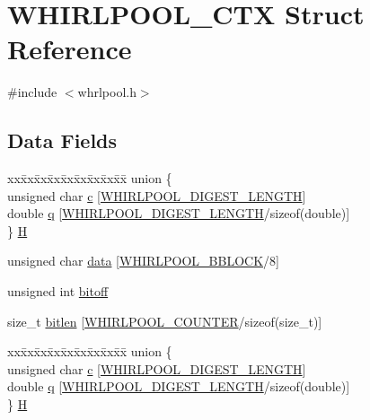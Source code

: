 \hypertarget{struct_w_h_i_r_l_p_o_o_l___c_t_x}{}\section{W\+H\+I\+R\+L\+P\+O\+O\+L\+\_\+\+C\+TX Struct Reference}
\label{struct_w_h_i_r_l_p_o_o_l___c_t_x}


{\ttfamily \#include $<$whrlpool.\+h$>$}

\subsection*{Data Fields}
\begin{DoxyCompactItemize}
\item 
\begin{tabbing}
xx\=xx\=xx\=xx\=xx\=xx\=xx\=xx\=xx\=\kill
union \{\\
\>unsigned char \hyperlink{struct_w_h_i_r_l_p_o_o_l___c_t_x_a9b61e0784ad7a3f2828b608b27e44411}{c} \mbox{[}\hyperlink{include_2openssl_2whrlpool_8h_addcbb5b0b778aef896b9eccd0c08e18e}{WHIRLPOOL\_DIGEST\_LENGTH}\mbox{]}\\
\>double \hyperlink{struct_w_h_i_r_l_p_o_o_l___c_t_x_abc789205c69c1409ed3b6acca07f8e44}{q} \mbox{[}\hyperlink{include_2openssl_2whrlpool_8h_addcbb5b0b778aef896b9eccd0c08e18e}{WHIRLPOOL\_DIGEST\_LENGTH}/sizeof(double)\mbox{]}\\
\} \hyperlink{struct_w_h_i_r_l_p_o_o_l___c_t_x_a3cd3cdd445b9358a464eb90ce8f307e3}{H}\\

\end{tabbing}\item 
unsigned char \hyperlink{struct_w_h_i_r_l_p_o_o_l___c_t_x_ae0325323f2cd409f2185c95bf8f0d4e8}{data} \mbox{[}\hyperlink{include_2openssl_2whrlpool_8h_a65ca1c8d3e51542563a11fa1ebaaa095}{W\+H\+I\+R\+L\+P\+O\+O\+L\+\_\+\+B\+B\+L\+O\+CK}/8\mbox{]}
\item 
unsigned int \hyperlink{struct_w_h_i_r_l_p_o_o_l___c_t_x_a12f585d21042f7d5bd18e794649c886b}{bitoff}
\item 
size\+\_\+t \hyperlink{struct_w_h_i_r_l_p_o_o_l___c_t_x_ac114cf8c9f71c2d0bea28144ce11cf6c}{bitlen} \mbox{[}\hyperlink{include_2openssl_2whrlpool_8h_a29662900a78ba844a98b6119ea32975f}{W\+H\+I\+R\+L\+P\+O\+O\+L\+\_\+\+C\+O\+U\+N\+T\+ER}/sizeof(size\+\_\+t)\mbox{]}
\item 
\begin{tabbing}
xx\=xx\=xx\=xx\=xx\=xx\=xx\=xx\=xx\=\kill
union \{\\
\>unsigned char \hyperlink{struct_w_h_i_r_l_p_o_o_l___c_t_x_a9b61e0784ad7a3f2828b608b27e44411}{c} \mbox{[}\hyperlink{include_2openssl_2whrlpool_8h_addcbb5b0b778aef896b9eccd0c08e18e}{WHIRLPOOL\_DIGEST\_LENGTH}\mbox{]}\\
\>double \hyperlink{struct_w_h_i_r_l_p_o_o_l___c_t_x_abc789205c69c1409ed3b6acca07f8e44}{q} \mbox{[}\hyperlink{include_2openssl_2whrlpool_8h_addcbb5b0b778aef896b9eccd0c08e18e}{WHIRLPOOL\_DIGEST\_LENGTH}/sizeof(double)\mbox{]}\\
\} \hyperlink{struct_w_h_i_r_l_p_o_o_l___c_t_x_a00b4a40c0906d9e34bc9f2d0df6bcd1b}{H}\\


\end{tabbing}
\end{DoxyCompactItemize}
